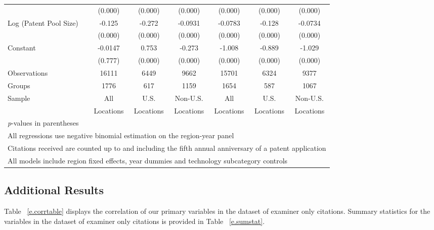 \documentclass[12pt,letterpaper]{article}
\begin{document}
\begin{table}[htbp]
\begin{tabular}{l*{6}{c}}
                &  (0.000)&  (0.000)&  (0.000)&  (0.000)&  (0.000)&  (0.000)\\
Log (Patent Pool Size)&   -0.125&   -0.272&  -0.0931&  -0.0783&   -0.128&  -0.0734\\
                &  (0.000)&  (0.000)&  (0.000)&  (0.000)&  (0.000)&  (0.000)\\
Constant        &  -0.0147&    0.753&   -0.273&   -1.008&   -0.889&   -1.029\\
                &  (0.777)&  (0.000)&  (0.000)&  (0.000)&  (0.000)&  (0.000)\\
\hline
Observations    &    16111&     6449&     9662&    15701&     6324&     9377\\
Groups          &     1776&      617&     1159&     1654&      587&     1067\\
Sample&All &U.S. &Non-U.S.&All &U.S. &Non-U.S. \\
          &Locations &Locations&Locations&Locations &Locations&Locations \\
\hline\hline
\multicolumn{7}{l}{\footnotesize \textit{p}-values in parentheses}\\
\multicolumn{7}{l}{\footnotesize All regressions use negative binomial estimation on the region-year panel}\\
\multicolumn{7}{l}{\footnotesize Citations received are counted up to and including the fifth annual anniversary of a patent application}\\
\multicolumn{7}{l}{\footnotesize All models include region fixed effects, year dummies and technology subcategory controls}\\
\end{tabular}
\end{table}

\subsection{Additional Results}
Table ~\ref{e.corrtable} displays the correlation of our primary variables in the dataset of examiner only citations. Summary statistics for the variables in the dataset of examiner only citations is provided in Table ~\ref{e.sumstat}.
\end{document}
